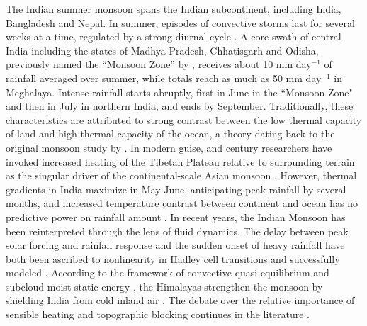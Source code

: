 \documentclass[12pt]{article}
\begin{document}
	The Indian summer monsoon spans the Indian subcontinent, including India, Bangladesh and Nepal. In summer, episodes of convective storms last for several weeks at a time, regulated by a strong diurnal cycle \citep{Romatschke2011a}. A core swath of central India including the states of Madhya Pradesh, Chhatisgarh and Odisha, previously named the ``Monsoon Zone'' by \cite{Gadgil2003}, receives about 10 mm day$^{-1}$ of rainfall averaged over summer, while totals reach as much as 50 mm day$^{-1}$ in Meghalaya. Intense rainfall starts abruptly, first in June in the ``Monsoon Zone" and then in July in northern India, and ends by September. Traditionally, these characteristics are attributed to strong contrast between the low thermal capacity of land and high thermal capacity of the ocean, a theory dating back to the original monsoon study by \cite{Halley1686}. In modern guise,  and  century researchers have invoked increased heating of the Tibetan Plateau relative to surrounding terrain as the singular driver of the continental-scale Asian monsoon \citep{Yeh1959,Li1996,Wu2007}. However, thermal gradients in India maximize in May-June, anticipating peak rainfall by several months, and increased temperature contrast between continent and ocean has no predictive power on rainfall amount \citep{Gadgil2003}. In recent years, the Indian Monsoon has been reinterpreted through the lens of fluid dynamics. The delay between peak solar forcing and rainfall response and the sudden onset of heavy rainfall have both been ascribed to nonlinearity in Hadley cell transitions and successfully modeled \citep{Plumb1992,Schneider2008,Bordoni2008}. According to the framework of convective quasi-equilibrium and subcloud moist static energy \citep{Emanuel1995,Prive2007,Prive2007a}, the Himalayas strengthen the monsoon by shielding India from cold inland air \citep{Boos2010}. The debate over the relative importance of sensible heating and topographic blocking continues in the literature \citep{Wu2012,Boos2013,Qiu2013}.
	
\end{document}
